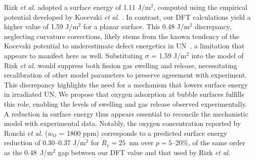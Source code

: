 \documentclass[preprint,12pt,sort&compress]{elsarticle}
\newcommand{\?}{\stackrel{?}{=}}
\begin{document}
Rizk \textit{et al.} adopted a surface energy of 1.11 J/m$^2$, computed using the empirical potential developed by Kocevski \textit{et al.} \cite{Kocevski2022II}. In contrast, our DFT calculations yield a higher value of 1.59 J/m$^2$ for a planar surface. This 0.48 J/m$^2$ discrepancy, neglecting curvature corrections, likely stems from the known tendency of the Kocevski potential to underestimate defect energetics in UN~\cite{AbdulHameed2024}, a limitation that appears to manifest here as well. Substituting $\sigma$ = 1.59 J/m$^2$ into the model of Rizk \textit{et al.} would suppress both fission gas swelling and release, necessitating recalibration of other model parameters to preserve agreement with experiment. This discrepancy highlights the need for a mechanism that lowers surface energy in irradiated UN. We propose that oxygen adsorption at bubble surfaces fulfills this role, enabling the levels of swelling and gas release observed experimentally. A reduction in surface energy thus appears essential to reconcile the mechanistic model with experimental data. Notably, the oxygen concentration reported by Ronchi \textit{et al.} ($w_\text{O}$ = 1800 ppm) corresponds to a predicted surface energy reduction of 0.30--0.37 J/m$^2$ for $R_v=25$~nm over $p=5$--20\%, of the same order as the 0.48~J/m$^2$ gap between our DFT value and that used by Rizk \textit{et al.}
\end{document}
